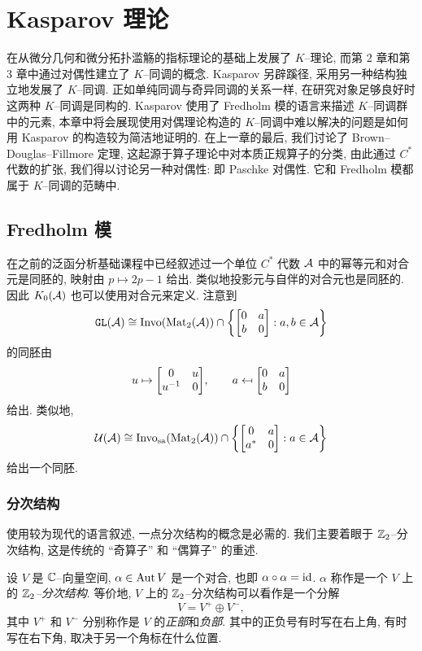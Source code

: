 
\chapter{Kasparov 理论}

在从微分几何和微分拓扑滥觞的指标理论的基础上发展了 $ K $--理论, 而第 2 章和第 3 章中通过对偶性建立了 $ K $--同调的概念. Kasparov 另辟蹊径, 采用另一种结构独立地发展了 $ K $--同调. 正如单纯同调与奇异同调的关系一样, 在研究对象足够良好时这两种 $ K $--同调是同构的. Kasparov 使用了 Fredholm 模的语言来描述 $ K $--同调群中的元素, 本章中将会展现使用对偶理论构造的 $ K $--同调中难以解决的问题是如何用 Kasparov 的构造较为简洁地证明的. 在上一章的最后, 我们讨论了 Brown--Douglas--Fillmore 定理, 这起源于算子理论中对本质正规算子的分类, 由此通过 $ C^* $ 代数的扩张, 我们得以讨论另一种对偶性: 即 Paschke 对偶性. 它和 Fredholm 模都属于 $ K $--同调的范畴中.

\section{Fredholm 模}

在之前的泛函分析基础课程中已经叙述过一个单位 $ C^* $ 代数 $ \mathcal{A} $ 中的幂等元和对合元是同胚的, 映射由 $ p\mapsto 2p-1 $ 给出. 类似地投影元与自伴的对合元也是同胚的. 因此 $ K_0(\mathcal{A}) $ 也可以使用对合元来定义. 注意到
\[
	\GL(\CA)\cong\text{Invo}(\Mat_2(\CA))\cap\set{\mqty[0 & a \\ b & 0] : a,b\in\CA}
\]
的同胚由
\[
	u\mapsto\mqty[0 & u \\ u^{-1} & 0],\qquad a\mapsfrom\mqty[0 & a \\ b & 0]
\]
给出. 类似地,
\[
	\CU(\CA)\cong\text{Invo}_{\text{sa}}(\Mat_2(\CA))\cap\set{\mqty[0 & a \\ a^* & 0] : a\in\CA}
\]
给出一个同胚.

\subsection{分次结构}

使用较为现代的语言叙述, 一点分次结构的概念是必需的. 我们主要着眼于 $ \Z_2 $--分次结构, 这是传统的 ``奇算子'' 和 ``偶算子'' 的重述.

\begin{Definition}[$ \Z_2 $--分次结构]
	设 $ V $ 是 $ \mathbb{C} $--向量空间, $ \alpha\in\mathrm{Aut}\, V $ 是一个对合, 也即 $ \alpha\circ\alpha=\mathrm{id} $. $ \alpha $ 称作是一个 $ V $ 上的 $ \Z_2 $\emph{--分次结构}. 等价地, $ V $ 上的 $ \Z_2 $--分次结构可以看作是一个分解
	\[
		V=V^+\oplus V^-,
	\]
	其中 $ V^+ $ 和 $ V^- $ 分别称作是 $ V $ 的\emph{正部}和\emph{负部}. 其中的正负号有时写在右上角, 有时写在右下角, 取决于另一个角标在什么位置.
\end{Definition}

